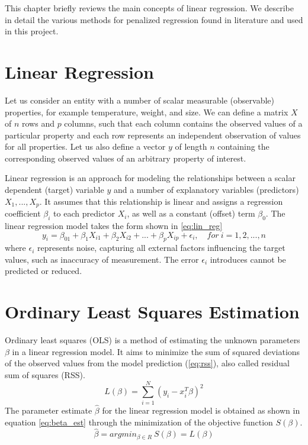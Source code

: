 This chapter briefly reviews the main concepts of linear regression. We describe in detail the various methods for penalized regression found in literature and used in this project.


\section{Linear Regression}
Let us consider an entity with a number of scalar measurable (observable) properties, for example temperature, weight, and size. We can define a matrix $X$ of $n$ rows and $p$ columns, such that each column contains the observed values of a particular property and each row represents an independent observation of values for all properties. Let us also define a vector $y$ of length $n$ containing the corresponding observed values of an arbitrary property of interest.

Linear regression is an approach for modeling the relationships between a scalar dependent (target) variable $y$ and a number of explanatory variables (predictors) $X_1,...,X_p$. It assumes that this relationship is linear and assigns a regression coefficient $\beta_i$ to each predictor $X_i$, as well as a constant (offset) term $\beta_0$. The linear regression model takes the form shown in \ref{eq:lin_reg}
\begin{equation} \label{eq:lin_reg}
y_i = \beta_01+\beta_1X_{i1}+\beta_2X_{i2}+...+\beta_pX_{ip}+\epsilon_i, \quad for\ i=1,2,...,n
\end{equation}
where $\epsilon_i$ represents noise, capturing all external factors influencing the target values, such as inaccuracy of measurement. The error $\epsilon_i$ introduces cannot be predicted or reduced.


\section{Ordinary Least Squares Estimation}
Ordinary least squares (OLS) is a method of estimating the unknown parameters $\beta$ in a linear regression model. It aims to minimize the sum of squared deviations of the observed values from the model prediction (\ref{eq:rss}), also called residual sum of squares (RSS).
\begin{equation} \label{eq:rss}
L(\beta) = \sum_{i=1}^{N} (y_i - x_i^T\beta)^2
\end{equation}
The parameter estimate $\hat{\beta}$ for the linear regression model is obtained as shown in equation \ref{eq:beta_est} through the minimization of the objective function $S(\beta)$.
\begin{equation} \label{eq:beta_est}
\hat{\beta} = argmin_{\beta \in R}\ S(\beta) = L(\beta)
\end{equation}


